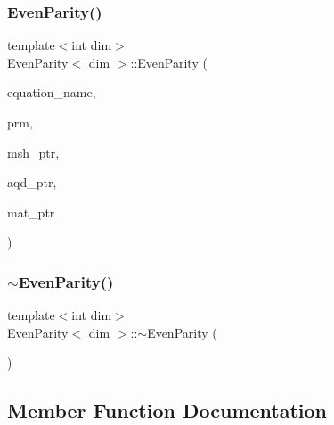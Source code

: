 \subsubsection{\texorpdfstring{Even\+Parity()}{EvenParity()}}
{\footnotesize\ttfamily template$<$int dim$>$ \\
\hyperlink{class_even_parity}{Even\+Parity}$<$ dim $>$\+::\hyperlink{class_even_parity}{Even\+Parity} (\begin{DoxyParamCaption}\item[{std\+::string}]{equation\+\_\+name,  }\item[{const Parameter\+Handler \&}]{prm,  }\item[{const std\+\_\+cxx11\+::shared\+\_\+ptr$<$ \hyperlink{class_mesh_generator}{Mesh\+Generator}$<$ dim $>$ $>$}]{msh\+\_\+ptr,  }\item[{const std\+\_\+cxx11\+::shared\+\_\+ptr$<$ \hyperlink{class_a_q_base}{A\+Q\+Base}$<$ dim $>$ $>$}]{aqd\+\_\+ptr,  }\item[{const std\+\_\+cxx11\+::shared\+\_\+ptr$<$ \hyperlink{class_material_properties}{Material\+Properties} $>$}]{mat\+\_\+ptr }\end{DoxyParamCaption})}

\mbox{\label{class_even_parity_a9c3caf641043e0a1e44632478946576b}} 
\subsubsection{\texorpdfstring{$\sim$\+Even\+Parity()}{~EvenParity()}}
{\footnotesize\ttfamily template$<$int dim$>$ \\
\hyperlink{class_even_parity}{Even\+Parity}$<$ dim $>$\+::$\sim$\hyperlink{class_even_parity}{Even\+Parity} (\begin{DoxyParamCaption}{ }\end{DoxyParamCaption})}



\subsection{Member Function Documentation}
\mbox{\label{class_even_parity_ae800cb49f85cf417167ca5385b50df6f}} 
